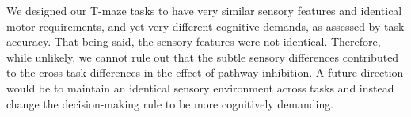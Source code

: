 We designed our T-maze tasks to have very similar sensory features and identical motor requirements, and yet very different cognitive demands, as assessed by task accuracy. That being said, the sensory features were not identical. Therefore, while unlikely, we cannot rule out that the subtle sensory differences contributed to the cross-task differences in the effect of pathway inhibition. A future direction would be to maintain an identical sensory environment across tasks and instead change the decision-making rule to be more cognitively demanding.

